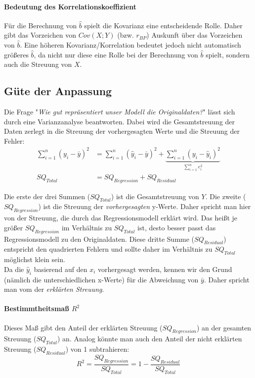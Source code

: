 \documentclass[a4paper]{article}
\newcommand\dangersign{%
 \makebox[1.8em][c]{%
 \makebox[0pt][c]{\raisebox{.15em}{\small!}}%
 \makebox[0pt][c]{\color{red}\Large$\triangle$}}}%
\begin{document}
\paragraph{Bedeutung des Korrelationskoeffizient} Für die Berechnung von $\hat{b}$ spielt die Kovarianz eine entscheidende Rolle. Daher gibt das Vorzeichen von $Cov(X;Y)$ (bzw. $r_{BP}$) Auskunft über das Vorzeichen von $\hat b$. Eine höheren Kovarianz/Korrelation bedeutet jedoch nicht automatisch größeres $\hat b$, da nicht nur diese eine Rolle bei der Berechnung von $\hat{b}$ spielt, sondern auch die Streuung von $X$.

\subsection{Güte der Anpassung}\label{sec:goodness-of-fit}
Die Frage "\textit{Wie gut repräsentiert unser Modell die Originaldaten?}" lässt sich durch eine Varianzanalyse beantworten. Dabei wird die Gesamtstreuung der Daten zerlegt in die Streuung der vorhergesagten Werte und die Streuung der Fehler:
\begin{align*}
    \sum_{i=1}^n(y_i-\bar{y})^2&=\sum_{i=1}^n(\hat{y}_i-\bar{y})^2 + \underbrace{\sum_{i=1}^n(y_i-\hat{y}_i)^2}_{\sum_{i=1}^n e_i^2}\\
    SQ_{Total}&=SQ_{Regression}+SQ_{Residual}
\end{align*}

\noindent Die erste der drei Summen ($SQ_{Total}$) ist die Gesamtstreuung von $Y$. Die zweite ($SQ_{Regression}$) ist die Streuung der \textit{vorhergesagten} y-Werte. Daher spricht man hier von der Streuung, die durch das Regressionsmodell erklärt wird. Das heißt je größer $SQ_{Regression}$ im Verhältnis zu $SQ_{Total}$ ist, desto besser passt das Regressionsmodell zu den Originaldaten. Diese dritte Summe ($SQ_{Residual}$) entspricht den quadrierten Fehlern und sollte daher im Verhältnis zu $SQ_{Total}$ möglichst klein sein.\\

\noindent \dangersign Da die $\hat y_i$ basierend auf den $x_i$ vorhergesagt werden, kennen wir den Grund (nämlich die unterschiedlichen x-Werte) für die Abweichung von $\bar y$. Daher spricht man vom der \textit{erklärten Streuung}.

\paragraph{Bestimmtheitsmaß $R^2$} Dieses Maß gibt den Anteil der erklärten Streuung ($SQ_{Regression}$) an der gesamten Streuung ($SQ_{Total}$) an. Analog könnte man auch den Anteil der nicht erklärten Streuung ($SQ_{Residual}$) von 1 subtrahieren:
$$R^2 = \frac{SQ_{Regression}}{SQ_{Total}} = 1 - \frac{SQ_{Residual}}{SQ_{Total}}$$
\end{document}
